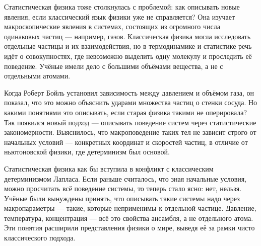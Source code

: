 
Статистическая физика тоже столкнулась с проблемой: как описывать новые явления, если классический язык физики уже не справляется? Она изучает макроскопические явления в системах, состоящих из огромного числа одинаковых частиц --- например, газов. Классическая физика могла исследовать отдельные частицы и их взаимодействия, но в термодинамике и статистике речь идёт о совокупностях, где невозможно выделить одну молекулу и проследить её поведение. Учёные имели дело с большими объёмами вещества, а не с отдельными атомами.

Когда Роберт Бойль установил зависимость между давлением и объёмом газа, он показал, что это можно объяснить ударами множества частиц о стенки сосуда. Но какими понятиями это описывать, если старая физика такими не оперировала? Так появился новый подход --- описывать поведение систем через статистические закономерности. Выяснилось, что макроповедение таких тел не зависит строго от начальных условий --- конкретных координат и скоростей частиц, в отличие от ньютоновской физики, где детерминизм был основой.

Статистическая физика как бы вступила в конфликт с классическим детерминизмом Лапласа. Если раньше считалось, что зная начальные условия, можно просчитать всё поведение системы, то теперь стало ясно: нет, нельзя. Учёные были вынуждены принять, что описывать такие системы надо через макропараметры --- такие, которые неприменимы к отдельной частице. Давление, температура, концентрация --- всё это свойства ансамбля, а не отдельного атома. Эти понятия расширили представления физики о мире, выведя её за рамки чисто классического подхода.


